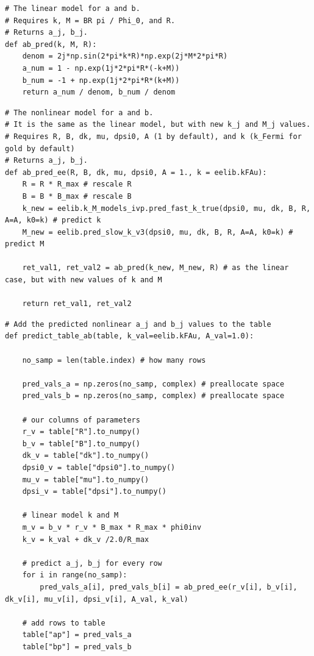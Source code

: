 \documentclass{article}
\begin{document}
\begin{lstlisting}
# The linear model for a and b.
# Requires k, M = BR pi / Phi_0, and R.
# Returns a_j, b_j.
def ab_pred(k, M, R):
    denom = 2j*np.sin(2*pi*k*R)*np.exp(2j*M*2*pi*R)
    a_num = 1 - np.exp(1j*2*pi*R*(-k+M))
    b_num = -1 + np.exp(1j*2*pi*R*(k+M))
    return a_num / denom, b_num / denom\end{lstlisting}

\begin{lstlisting}
# The nonlinear model for a and b.
# It is the same as the linear model, but with new k_j and M_j values.
# Requires R, B, dk, mu, dpsi0, A (1 by default), and k (k_Fermi for gold by default)
# Returns a_j, b_j.
def ab_pred_ee(R, B, dk, mu, dpsi0, A = 1., k = eelib.kFAu):
    R = R * R_max # rescale R
    B = B * B_max # rescale B
    k_new = eelib.k_M_models_ivp.pred_fast_k_true(dpsi0, mu, dk, B, R, A=A, k0=k) # predict k
    M_new = eelib.pred_slow_k_v3(dpsi0, mu, dk, B, R, A=A, k0=k) # predict M
    
    ret_val1, ret_val2 = ab_pred(k_new, M_new, R) # as the linear case, but with new values of k and M

    return ret_val1, ret_val2\end{lstlisting}

\begin{lstlisting}
# Add the predicted nonlinear a_j and b_j values to the table
def predict_table_ab(table, k_val=eelib.kFAu, A_val=1.0):

    no_samp = len(table.index) # how many rows

    pred_vals_a = np.zeros(no_samp, complex) # preallocate space
    pred_vals_b = np.zeros(no_samp, complex) # preallocate space

    # our columns of parameters
    r_v = table["R"].to_numpy()
    b_v = table["B"].to_numpy()
    dk_v = table["dk"].to_numpy()
    dpsi0_v = table["dpsi0"].to_numpy()
    mu_v = table["mu"].to_numpy()
    dpsi_v = table["dpsi"].to_numpy()

    # linear model k and M
    m_v = b_v * r_v * B_max * R_max * phi0inv
    k_v = k_val + dk_v /2.0/R_max

    # predict a_j, b_j for every row
    for i in range(no_samp):
        pred_vals_a[i], pred_vals_b[i] = ab_pred_ee(r_v[i], b_v[i], dk_v[i], mu_v[i], dpsi_v[i], A_val, k_val)

    # add rows to table
    table["ap"] = pred_vals_a
    table["bp"] = pred_vals_b\end{lstlisting}
\end{document}

